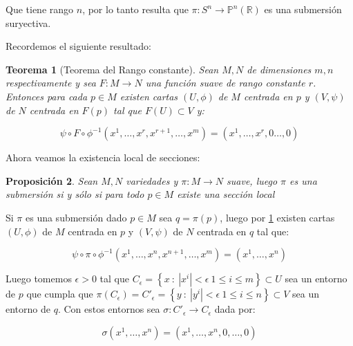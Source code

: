\documentclass[11pt]{article}
\newcommand{\R}{{\mathbb{R}}}
\newcommand\tq{~:~}
\newcommand{\abs}[1]{\left\lvert#1\right\rvert}
\newcommand{\sett}[1]{\left\lbrace#1\right\rbrace}
\newtheorem{theorem}{Teorema}
\numberwithin{theorem}{subsection}
\newtheorem{proposition}[theorem]{Proposici\'on}
\newenvironment{proof}[1][Demostraci\'on]{\begin{trivlist}
		\item[\hskip \labelsep {\bfseries #1}]}{\end{trivlist}}
\newcommand{\qed}{\nobreak \ifvmode \relax \else
	\ifdim\lastskip<1.5em \hskip-\lastskip
	\hskip1.5em plus0em minus0.5em \fi \nobreak
	\vrule height0.75em width0.5em depth0.25em\fi}
\begin{document}
\begin{solution}
\begin{proof}
		Que tiene rango $n$, por lo tanto resulta que $\pi:S^n\to\mathbb{P}^n(\R)$ es una submersi\'on suryectiva.\qed
		
	\end{proof}
	
	Recordemos el siguiente resultado:
	
	\begin{theorem}[Teorema del Rango constante]
		\label{Teorema del rango constante}
		Sean $M,N$ de dimensiones $m,n$ respectivamente y sea $F : M \rightarrow N$ una funci\'on suave de rango constante $r$. Entonces para cada $p \in M$ existen cartas $(U,\phi)$ de $M$ centrada en $p$ y $(V, \psi)$ de $N$ centrada en $F(p)$ tal que $F(U) \subset V$ y:
		
		\begin{equation*}
			\psi \circ F \circ \phi^{-1} (x^1, \dots , x^r, x^{r+1}, \dots, x^m) = (x^1,  \dots , x^r, 0 \dots , 0)
		\end{equation*}
		
	\end{theorem}
	
	Ahora veamos la existencia local de secciones:
	
	\begin{proposition}
		Sean $M,N$ variedades  y $\pi : M \rightarrow N$ suave, luego $\pi$ es una submersi\'on si y s\'olo si para todo $p \in M$ existe una secci\'on local
	\end{proposition}
	
	\begin{proof}
		Si $\pi$ es una submersi\'on dado $p \in M$ sea $q = \pi(p)$, luego por \ref{Teorema del rango constante} existen cartas $(U,\phi)$ de $M$ centrada en $p$ y $(V, \psi)$ de $N$ centrada en $q$ tal que:
		
		\begin{equation*}
			\psi \circ \pi \circ \phi^{-1}\left(x^1, \dots, x^n, x^{n+1}, \dots , x^m\right) = (x^1 , \dots , x^n)
		\end{equation*}
		
		Luego tomemos $\epsilon> 0$ tal que $C_{\epsilon} = \sett{x \tq \abs{x^i} < \epsilon \ 1 \leq  i \leq m} \subset U$ sea un entorno de $p$ que cumpla que $\pi(C_{\epsilon}) = C'_{\epsilon} = \sett{y \tq \abs{y^i} < \epsilon \ 1 \leq i \leq n} \subset V$ sea un entorno de $q$. Con estos entornos sea $\sigma : C'_{\epsilon} \rightarrow C_{\epsilon}$ dada por:
		
		\begin{equation*}
			\sigma(x^1, \dots , x^n) = (x^1, \dots , x^n, 0, \dots , 0)
		\end{equation*}
		

\end{proof}
\end{solution}
\end{document}
